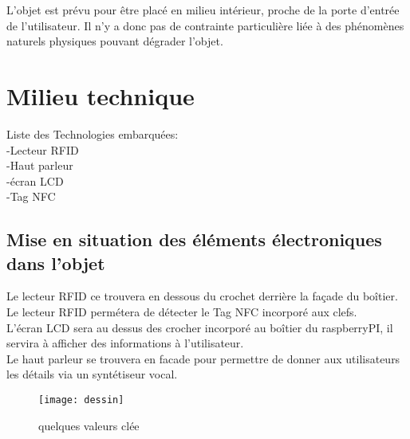 \documentclass[12pt]{article}
\begin{document}
L’objet est prévu pour être placé en milieu intérieur, proche de la porte d'entrée de
l’utilisateur. Il n’y a donc pas de contrainte particulière liée à des phénomènes
naturels physiques pouvant dégrader l’objet.

\section{Milieu technique}
Liste des Technologies embarquées:\\
-Lecteur RFID\\
-Haut parleur\\
-écran LCD\\
-Tag NFC\\

\subsection{Mise en situation des éléments électroniques dans l’objet}

Le lecteur RFID ce trouvera en dessous du crochet derrière la façade du boîtier. Le lecteur RFID permétera de détecter le Tag NFC incorporé aux clefs.  \\
L'écran LCD sera au dessus des crocher incorporé au boîtier du raspberryPI, il servira à afficher des informations à l'utilisateur.\\
Le haut parleur se trouvera en facade pour permettre de donner aux utilisateurs les détails via un syntétiseur vocal.


\begin{figure}[!ht]
    \center
    \texttt{[image: dessin]}
    \caption{quelques valeurs clée}
\end{figure}
\end{document}
